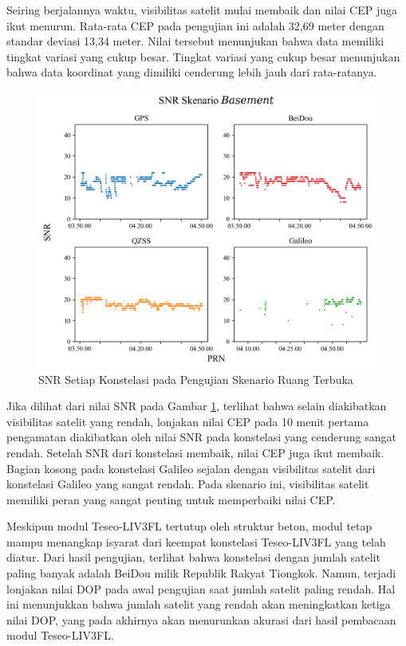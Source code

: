 Seiring berjalannya waktu, visibilitas satelit mulai membaik dan nilai CEP juga ikut menurun. Rata-rata CEP pada pengujian ini adalah 32,69 meter dengan standar deviasi 13,34 meter. Nilai tersebut menunjukan bahwa data memiliki tingkat variasi yang cukup besar. Tingkat variasi yang cukup besar menunjukan bahwa data koordinat yang dimiliki cenderung lebih jauh dari rata-ratanya.

\begin{figure}[H]
	\centering
	\includegraphics[width=13cm]{contents/chapter-4/1-skenario-basement/snr.png}
	\caption{SNR Setiap Konstelasi pada Pengujian Skenario Ruang Terbuka}
	\label{Fig: basement-snr}
\end{figure}

Jika dilihat dari nilai SNR pada Gambar \ref{Fig: basement-snr}, terlihat bahwa selain diakibatkan visibilitas satelit yang rendah, lonjakan nilai CEP pada 10 menit pertama pengamatan diakibatkan oleh nilai SNR pada konstelasi yang cenderung sangat rendah. Setelah SNR dari konstelasi membaik, nilai CEP juga ikut membaik. Bagian kosong pada konstelasi Galileo sejalan dengan visibilitas satelit dari konstelasi Galileo yang sangat rendah. Pada skenario ini, visibilitas satelit memiliki peran yang sangat penting untuk memperbaiki nilai CEP.

Meskipun modul Teseo-LIV3FL tertutup oleh struktur beton, modul tetap mampu menangkap isyarat dari keempat konstelasi Teseo-LIV3FL yang telah diatur. Dari hasil pengujian, terlihat bahwa konstelasi dengan jumlah satelit paling banyak adalah BeiDou milik Republik Rakyat Tiongkok. Namun, terjadi lonjakan nilai DOP pada awal pengujian saat jumlah satelit paling rendah. Hal ini menunjukkan bahwa jumlah satelit yang rendah akan meningkatkan ketiga nilai DOP, yang pada akhirnya akan menurunkan akurasi dari hasil pembacaan modul Teseo-LIV3FL.

